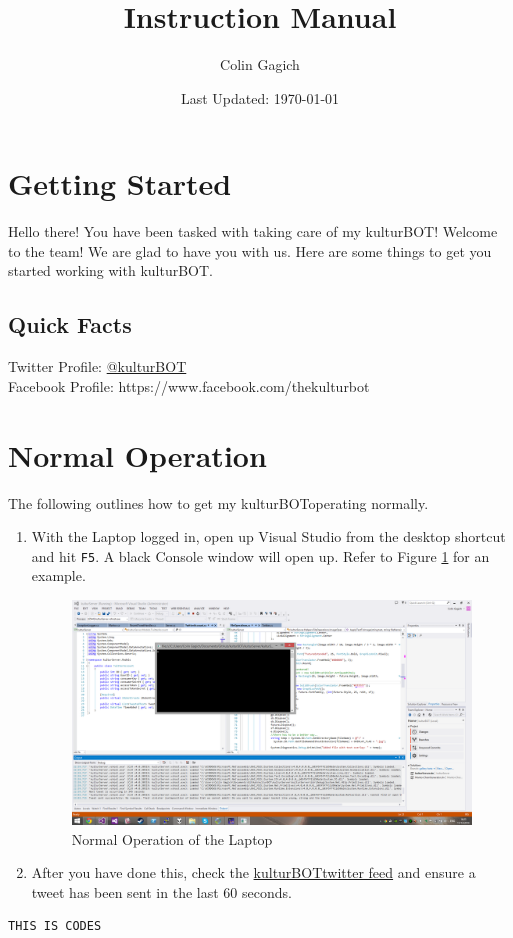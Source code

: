 \documentclass[]{article}
\title{\kbspace Instruction Manual}
\author{Colin Gagich}
\date{Last Updated: \today}
\newcommand{\kb}{kulturBOT}
\newcommand{\kbspace}{\kb \space}
\newcommand{\mykb}{my \kb}
\newcommand{\mykbspace}{\mykb \space}
\begin{document}
\maketitle

\newpage

\tableofcontents
\newpage

\section{Getting Started}
Hello there! You have been tasked with taking care of \mykb! Welcome to the team! We are glad to have you with us. Here are some things to get you started working with \kb.

\subsection{Quick Facts}

Twitter Profile: \href{https://twitter.com/kulturBOT}{@kulturBOT} \\
Facebook Profile: https://www.facebook.com/thekulturbot

\section{Normal Operation}
The following outlines how to get \mykbspace operating normally.

\begin{enumerate}
	\item With the Laptop logged in, open up Visual Studio from the desktop shortcut and hit \texttt{F5}. A black Console window will open up. Refer to Figure \ref{normalVS} for an example.
	
	\begin{figure}[h!]
	\label{normalVS}
		\centering
	    \includegraphics[width=1\textwidth]{img/normalVSlook.png}
	    \caption{Normal Operation of the Laptop}
	\end{figure}
	
	\item After you have done this, check the \href{https://twitter.com/kulturBOT}{\kbspace twitter feed} and ensure a tweet has been sent in the last 60 seconds.
\end{enumerate}
\begin{lstlisting}[frame=single]
THIS IS CODES
\end{lstlisting}
\end{document}

